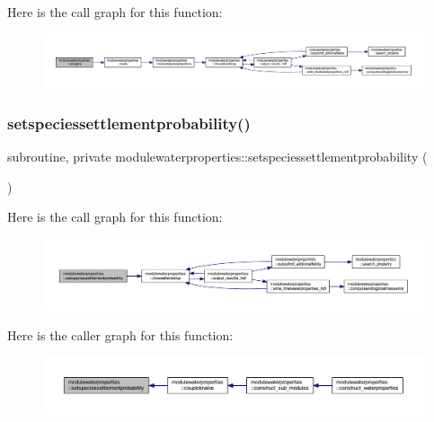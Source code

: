 Here is the call graph for this function\+:\nopagebreak
\begin{figure}[H]
\begin{center}
\leavevmode
\includegraphics[width=350pt]{namespacemodulewaterproperties_a84c625b22d0fa0200b0f18fc38efb8e7_cgraph}
\end{center}
\end{figure}
\mbox{\label{namespacemodulewaterproperties_a634883e39ff4b721f62c2324303fa3c4}} 
\subsubsection{\texorpdfstring{setspeciessettlementprobability()}{setspeciessettlementprobability()}}
{\footnotesize\ttfamily subroutine, private modulewaterproperties\+::setspeciessettlementprobability (\begin{DoxyParamCaption}{ }\end{DoxyParamCaption})\hspace{0.3cm}{\ttfamily [private]}}

Here is the call graph for this function\+:\nopagebreak
\begin{figure}[H]
\begin{center}
\leavevmode
\includegraphics[width=350pt]{namespacemodulewaterproperties_a634883e39ff4b721f62c2324303fa3c4_cgraph}
\end{center}
\end{figure}
Here is the caller graph for this function\+:\nopagebreak
\begin{figure}[H]
\begin{center}
\leavevmode
\includegraphics[width=350pt]{namespacemodulewaterproperties_a634883e39ff4b721f62c2324303fa3c4_icgraph}
\end{center}
\end{figure}
\mbox{\label{namespacemodulewaterproperties_a2550f7996bf177225c3f5a9830c86707}} 
